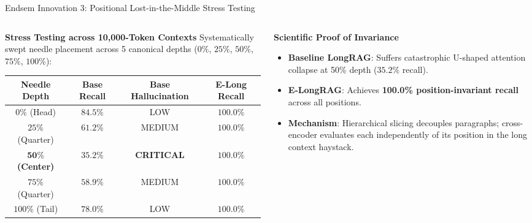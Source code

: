 \documentclass[10pt,aspectratio=169]{beamer}
\begin{document}
\begin{frame}{Endsem Innovation 3: Positional Lost-in-the-Middle Stress Testing}
    \begin{columns}[onlytextwidth,T]
        \begin{column}{0.54\textwidth}
            \begin{block}{\textbf{Stress Testing across 10,000-Token Contexts}}
                Systematically swept needle placement across 5 canonical depths ($0\%$, $25\%$, $50\%$, $75\%$, $100\%$):
                \vspace{0.1cm}
                \scriptsize
                \begin{tabular}{cccc}
                    \toprule
                    \textbf{Needle Depth} & \textbf{Base Recall} & \textbf{Base Hallucination} & \textbf{E-Long Recall} \\
                    \midrule
                    $0\%$ (Head) & $84.5\%$ & LOW & $\mathbf{100.0\%}$ \\
                    $25\%$ (Quarter) & $61.2\%$ & MEDIUM & $\mathbf{100.0\%}$ \\
                    $\mathbf{50\%}$ \textbf{(Center)} & $\mathbf{35.2\%}$ & \textbf{CRITICAL} & $\mathbf{100.0\%}$ \\
                    $75\%$ (Quarter) & $58.9\%$ & MEDIUM & $\mathbf{100.0\%}$ \\
                    $100\%$ (Tail) & $78.0\%$ & LOW & $\mathbf{100.0\%}$ \\
                    \bottomrule
                \end{tabular}
            \end{block}
        \end{column}
        
        \begin{column}{0.44\textwidth}
            \begin{alertblock}{\textbf{Scientific Proof of Invariance}}
                \begin{itemize}\setlength\itemsep{3pt}
                    \item \textbf{Baseline LongRAG}: Suffers catastrophic U-shaped attention collapse at 50\% depth ($35.2\%$ recall).
                    \item \textbf{E-LongRAG}: Achieves \textbf{100.0\% position-invariant recall} across all positions.
                    \item \textbf{Mechanism}: Hierarchical slicing decouples paragraphs; cross-encoder evaluates each independently of its position in the long context haystack.
                \end{itemize}
            \end{alertblock}
        \end{column}
    \end{columns}
\end{frame}
\end{document}
